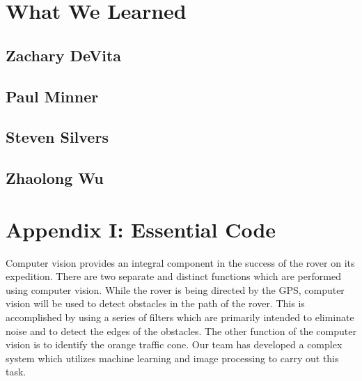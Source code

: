 \documentclass[10pt,letterpaper,onecolumn,draftclsnofoot,journal]{IEEEtran}
\begin{document}
\section{\textbf{What We Learned}}

\subsection{\textbf{Zachary DeVita}}

\subsection{\textbf{Paul Minner}}

\subsection{\textbf{Steven Silvers}}

\subsection{\textbf{Zhaolong Wu}}






\section{\textbf{Appendix I: Essential Code}}
Computer vision provides an integral component in the success of the rover on its expedition. There are two separate and distinct functions which are performed using computer vision. While the rover is being directed by the GPS, computer vision will be used to detect obstacles in the path of the rover. This is accomplished by using a series of filters which are primarily intended to eliminate noise and to detect the edges of the obstacles. The other function of the computer vision is to identify the orange traffic cone. Our team has developed a complex system which utilizes machine learning and image processing to carry out this task.\vspace{.3cm}
\par
\end{document}
